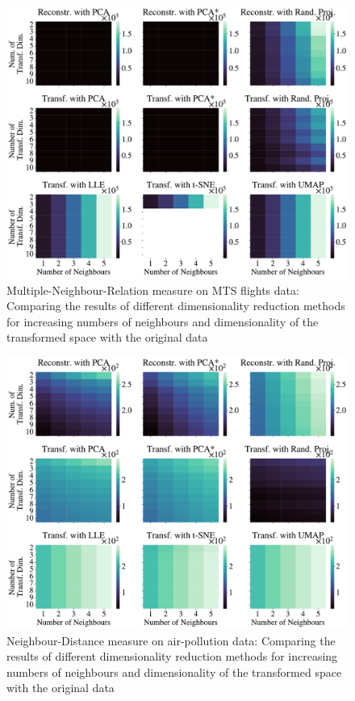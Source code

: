 \documentclass[pdftex,12pt,a4paper]{report}
\begin{document}
\begin{figure}
    \includegraphics[width = \textwidth]{images/real-world/flights/dyn_low_dim_vs_num_neigh/multiple_scalar_product/all_methods_1runs_10lines_4660points_5neighbours.pdf}
    \caption{Multiple-Neighbour-Relation measure on MTS flights data: Comparing the results of different dimensionality reduction methods for increasing numbers of neighbours and dimensionality of the transformed space with the original data} \label{fig:num_neigh_vs_dyn_low-mscal-flights}
\end{figure}


\begin{figure}
    \includegraphics[width = \textwidth]{images/real-world/air_pollution/dyn_low_dim_vs_num_neigh/euclidean/all_methods_1runs_1lines_4380points_5neighbours.pdf}
    \caption{Neighbour-Distance measure on air-pollution data: Comparing the results of different dimensionality reduction methods for increasing numbers of neighbours and dimensionality of the transformed space with the original data} \label{fig:num_neigh_vs_dyn_low-eucl-air}
\end{figure}
\end{document}
